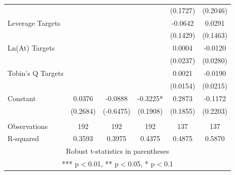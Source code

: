 \documentclass[12pt]{article}
\begin{document}
\begin{table}[ht]
\begin{adjustbox}{height=10cm, max width=\textwidth}
\begin{tabular}{lccccc}
			 &  &  &  & (0.1727) & (0.2046) \\
			Leverage Targets &  &  &  & -0.0642 & 0.0291 \\
			 &  &  &  & (0.1429) & (0.1463) \\
			Ln(At) Targets &  &  &  & 0.0004 & -0.0120 \\
			 &  &  &  & (0.0237) & (0.0280) \\
			Tobin's Q Targets &  &  &  & 0.0021 & -0.0190 \\
			 &  &  &  & (0.0154) & (0.0215) \\
			Constant & 0.0376 & -0.0888 & -0.3225* & 0.2873 & -0.1172 \\
			 & (0.2684) & (-0.6475) & (0.1908) & (0.1855) & (0.2203) \\
			 &  &  &  &  &  \\
			Observations & 192 & 192 & 192 & 137 & 137 \\
			 R-squared & 0.3593 & 0.3975 & 0.4375 & 0.4875 & 0.5870 \\ \hline
			\multicolumn{6}{c}{ Robust t-statistics in parentheses} \\
			\multicolumn{6}{c}{ *** p$<$0.01, ** p$<$0.05, * p$<$0.1} \\
			\end{tabular}
	\end{adjustbox}
	\end{table}
\end{document}
